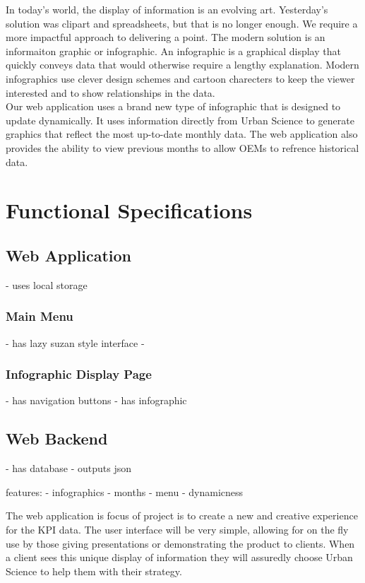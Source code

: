 \documentclass[11pt,a4paper,oneside]{article}
\begin{document}
In today's world, the display of information is an evolving art.  Yesterday's solution was clipart and spreadsheets, but that is no longer enough.  We require a more impactful approach to delivering a point.  The modern solution is an informaiton graphic or infographic.  An infographic is a graphical display that quickly conveys data that would otherwise require a lengthy explanation.  Modern infographics use clever design schemes and cartoon charecters to keep the viewer interested and to show relationships in the data.\\


Our web application uses a brand new type of infographic that is designed to update dynamically.  It uses information directly from Urban Science to generate graphics that reflect the most up-to-date monthly data.  The web application also provides the ability to view previous months to allow OEMs to refrence historical data.\\


\section{Functional Specifications}

\subsection {Web Application}
 - uses local storage


\subsubsection {Main Menu}
 - has lazy suzan style interface
 - 

\subsubsection {Infographic Display Page}
 - has navigation buttons
 - has infographic


\subsection {Web Backend}
 - has database
 - outputs json



features: 
   - infographics
   - months
   - menu
   - dynamicness


The web application is focus of project is to create a new and creative experience for the KPI data. The user interface will be very simple, allowing for on the fly use by those giving presentations or demonstrating the product to clients. When a client sees this unique display of information they will assuredly choose Urban Science to help them with their strategy.\\
\end{document}
